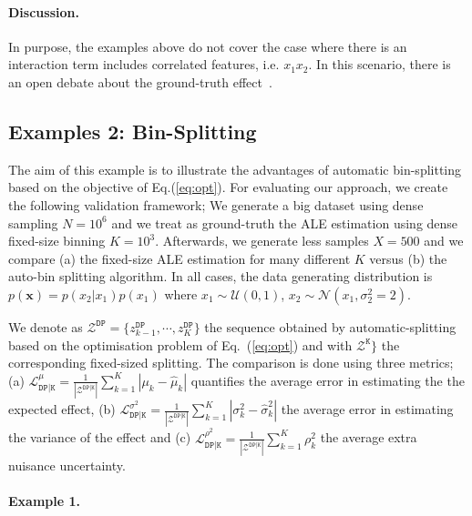 \documentclass[twoside]{article}
\begin{document}
\paragraph{Discussion.}

In purpose, the examples above do not cover the case where there is an
interaction term includes correlated features, i.e. \(x_1x_2\). In
this scenario, there is an open debate about the ground-truth
effect~\citep{Gromping2020MAEP}.

\subsection{Examples 2: Bin-Splitting}
\label{sec:simulation-examples-2}

The aim of this example is to illustrate the advantages of automatic
bin-splitting based on the objective of Eq.(\ref{eq:opt}). For
evaluating our approach, we create the following validation framework;
We generate a big dataset using dense sampling \(N=10^6\) and we treat
as ground-truth the ALE estimation using dense fixed-size binning
\(K=10^3\). Afterwards, we generate less samples \(X=500\) and we
compare (a) the fixed-size ALE estimation for many different \(K\)
versus (b) the auto-bin splitting algorithm. In all cases, the data
generating distribution is \(p(\mathbf{x}) = p(x_2|x_1)p(x_1)\) where
\(x_1 \sim \mathcal{U}(0,1)\),
\(x_2 \sim \mathcal{N}(x_1, \sigma_2^2=2)\).

We denote as
\(\mathcal{Z^{\mathtt{DP}}} = \{z^{\mathtt{DP}}_{k-1}, \cdots,
z^{\mathtt{DP}}_{K}\}\) the sequence obtained by automatic-splitting
based on the optimisation problem of Eq.~(\ref{eq:opt}) and with
\(\mathcal{Z^{\mathtt{K}}}\}\) the corresponding fixed-sized
splitting. The comparison is done using three metrics; (a)
\(\mathcal{L}_{\mathtt{DP|K}}^{\mu} =
\frac{1}{|\mathcal{Z}^{\mathtt{DP|K}}|} \sum_{k=1}^K | \mu_k -
\hat{\mu}_k | \) quantifies the average error in estimating the the
expected effect, (b)
\(\mathcal{L}_{\mathtt{DP|K}}^{\sigma^2} =
\frac{1}{|\mathcal{Z}^{\mathtt{DP|K}}|} \sum_{k=1}^K | \sigma_k^2 -
\hat{\sigma}^2_k | \) the average error in estimating the variance of
the effect and (c)
\(\mathcal{L}^{\rho^2}_{\mathtt{DP|K}} =
\frac{1}{|\mathcal{Z}^{\mathtt{DP|K}}|} \sum_{k=1}^K \rho^2_k \) the
average extra nuisance uncertainty.

\paragraph{Example 1.}
\end{document}
